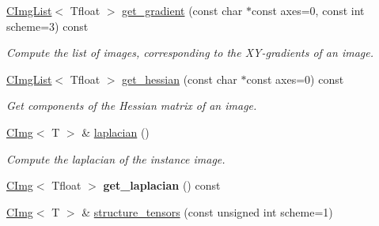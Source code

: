 \begin{DoxyCompactItemize}
\item 
\hyperlink{structcimg__library_1_1CImgList}{CImgList}$<$ Tfloat $>$ \hyperlink{structcimg__library_1_1CImg_a3e5b54c0b862cbf6e9f14e832984c4d7}{get\_\-gradient} (const char $\ast$const axes=0, const int scheme=3) const 
\begin{DoxyCompactList}\small\item\em Compute the list of images, corresponding to the XY-\/gradients of an image. \item\end{DoxyCompactList}\item 
\hypertarget{structcimg__library_1_1CImg_a96e3e0c617e70a833492043d08a7905a}{
\hyperlink{structcimg__library_1_1CImgList}{CImgList}$<$ Tfloat $>$ \hyperlink{structcimg__library_1_1CImg_a96e3e0c617e70a833492043d08a7905a}{get\_\-hessian} (const char $\ast$const axes=0) const }
\label{structcimg__library_1_1CImg_a96e3e0c617e70a833492043d08a7905a}

\begin{DoxyCompactList}\small\item\em Get components of the Hessian matrix of an image. \item\end{DoxyCompactList}\item 
\hypertarget{structcimg__library_1_1CImg_a20421622aaeaa372600c4ceeb39facd5}{
\hyperlink{structcimg__library_1_1CImg}{CImg}$<$ T $>$ \& \hyperlink{structcimg__library_1_1CImg_a20421622aaeaa372600c4ceeb39facd5}{laplacian} ()}
\label{structcimg__library_1_1CImg_a20421622aaeaa372600c4ceeb39facd5}

\begin{DoxyCompactList}\small\item\em Compute the laplacian of the instance image. \item\end{DoxyCompactList}\item 
\hypertarget{structcimg__library_1_1CImg_a0ba6d1886b2df0cc4c321d9618a0094f}{
\hyperlink{structcimg__library_1_1CImg}{CImg}$<$ Tfloat $>$ {\bfseries get\_\-laplacian} () const }
\label{structcimg__library_1_1CImg_a0ba6d1886b2df0cc4c321d9618a0094f}

\item 
\hypertarget{structcimg__library_1_1CImg_ac72b1d0b40c0bd0c4d54cf11ee4d6dd3}{
\hyperlink{structcimg__library_1_1CImg}{CImg}$<$ T $>$ \& \hyperlink{structcimg__library_1_1CImg_ac72b1d0b40c0bd0c4d54cf11ee4d6dd3}{structure\_\-tensors} (const unsigned int scheme=1)}
\label{structcimg__library_1_1CImg_ac72b1d0b40c0bd0c4d54cf11ee4d6dd3}


\end{DoxyCompactItemize}
